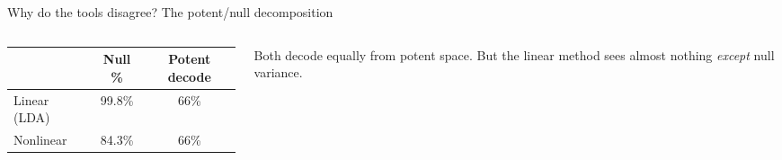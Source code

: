 \documentclass[aspectratio=169,11pt]{beamer}
\begin{document}
\begin{frame}{Why do the tools disagree? The potent/null decomposition}
\begin{columns}[T]
\begin{column}{0.48\textwidth}
\vspace{0.2em}
\centering
{\scriptsize
\begin{tabular}{lcc}
\toprule
& \textbf{Null \%} & \textbf{Potent decode} \\
\midrule
Linear (LDA) & 99.8\% & 66\% \\
Nonlinear & 84.3\% & 66\% \\
\bottomrule
\end{tabular}
}
\end{column}
\begin{column}{0.48\textwidth}
\vspace{0.8em}
{\small Both decode equally from potent space. But the linear method sees almost nothing \emph{except} null variance.}
\end{column}
\end{columns}
\end{frame}
\end{document}
